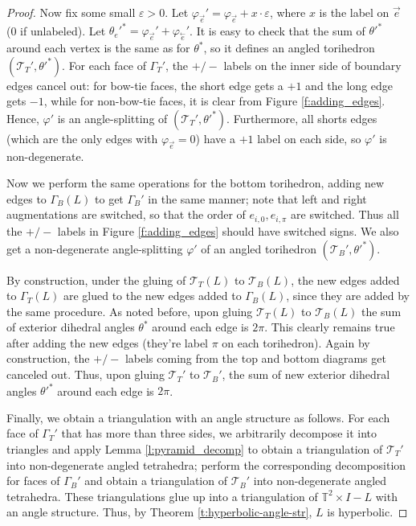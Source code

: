 \documentclass[11pt]{amsart}
\newcommand{\thmref}[1]{Theorem \ref{#1}}
\newcommand{\lemref}[1]{Lemma \ref{#1}}
\newcommand{\figref}[1]{Figure \ref{#1}}
\newcommand{\torus}{{\mathbb{T}^2}}
\newcommand{\sT}{{\mathcal{T}}}
\newcommand{\cev}[1]{\overset{\leftarrow}{#1}}
\newcommand{\vphi}{\varphi}
\newcommand{\veps}{\varepsilon}
\newcommand{\toruscomp}[1]{{\torus \times I - #1}}
\theoremstyle{plain}
\theoremstyle{definition}
\begin{document}
\begin{proof}
Now fix some small $\veps > 0$.
Let $\vphi_{\vec{e}}' = \vphi_{\vec{e}} + x \cdot \veps$,
where $x$ is the label on $\vec{e}$ (0 if unlabeled).
Let $\theta_e'^* = \vphi_{\vec{e}}' + \vphi_{\cev{e}}'$.
It is easy to check that the sum of $\theta'^*$
around each vertex is the same as for $\theta^*$,
so it defines an angled torihedron $(\sT_T',\theta'^*)$.
For each face of $\Gamma_T'$, the $+/-$ labels
on the inner side of boundary edges cancel out:
for bow-tie faces, the short edge gets a $+1$ and the long edge
gets $-1$, while for non-bow-tie faces,
it is clear from \figref{f:adding_edges}.
Hence, $\vphi'$ is an angle-splitting of $(\sT_T',\theta'^*)$.
Furthermore, all shorts edges
(which are the only edges with $\vphi_{\vec{e}} = 0$)
have a $+1$ label on each side,
so $\vphi'$ is non-degenerate.


Now we perform the same operations for the bottom torihedron,
adding new edges to $\Gamma_B(L)$ to get $\Gamma_B'$
in the same manner;
note that left and right augmentations are switched,
so that the order of $e_{i,0},e_{i,\pi}$ are switched.
Thus all the $+/-$ labels in \figref{f:adding_edges}
should have switched signs.
We also get a non-degenerate angle-splitting $\vphi'$
of an angled torihedron $(\sT_B',\theta'^*)$.


By construction, under the gluing of
$\sT_T(L)$ to $\sT_B(L)$,
the new edges added to $\Gamma_T(L)$
are glued to the new edges added to $\Gamma_B(L)$,
since they are added by the same procedure.
As noted before, upon gluing $\sT_T(L)$ to $\sT_B(L)$
the sum of exterior dihedral angles $\theta^*$ around each edge
is $2\pi$.
This clearly remains true after adding the new edges
(they're label $\pi$ on each torihedron).
Again by construction,
the $+/-$ labels coming from the top and bottom diagrams get canceled out.
Thus, upon gluing $\sT_T'$ to $\sT_B'$,
the sum of new exterior dihedral angles $\theta'^*$ around each edge
is $2\pi$.


Finally, we obtain a triangulation with an angle structure as follows.
For each face of $\Gamma_T'$ that has more than three sides,
we arbitrarily decompose it into triangles
and apply \lemref{l:pyramid_decomp}
to obtain a triangulation of $\sT_T'$ into non-degenerate angled tetrahedra;
perform the corresponding decomposition for faces of
$\Gamma_B'$ and obtain a triangulation of $\sT_B'$
into non-degenerate angled tetrahedra.
These triangulations glue up into a triangulation of $\toruscomp{L}$
with an angle structure.
Thus, by \thmref{t:hyperbolic-angle-str},
$L$ is hyperbolic.
\end{proof}





\end{document}
